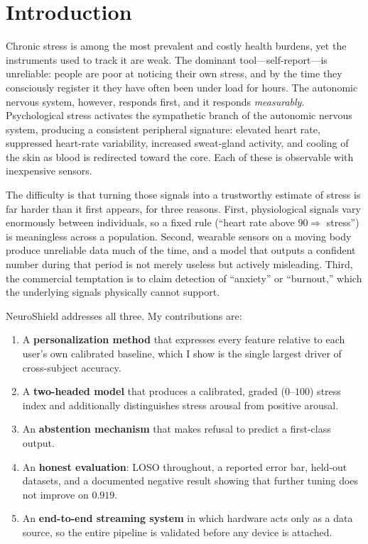 \documentclass[11pt,a4paper]{article}
\begin{document}
\section{Introduction}

Chronic stress is among the most prevalent and costly health burdens, yet the instruments used to
track it are weak. The dominant tool---self-report---is unreliable: people are poor at noticing
their own stress, and by the time they consciously register it they have often been under load for
hours. The autonomic nervous system, however, responds first, and it responds \emph{measurably}.
Psychological stress activates the sympathetic branch of the autonomic nervous system, producing a
consistent peripheral signature: elevated heart rate, suppressed heart-rate variability, increased
sweat-gland activity, and cooling of the skin as blood is redirected toward the core. Each of these
is observable with inexpensive sensors.

The difficulty is that turning those signals into a trustworthy estimate of stress is far harder
than it first appears, for three reasons. First, physiological signals vary enormously between
individuals, so a fixed rule (``heart rate above $90 \Rightarrow$ stress'') is meaningless across a
population. Second, wearable sensors on a moving body produce unreliable data much of the time, and
a model that outputs a confident number during that period is not merely useless but actively
misleading. Third, the commercial temptation is to claim detection of ``anxiety'' or ``burnout,''
which the underlying signals physically cannot support.

NeuroShield addresses all three. My contributions are:

\begin{enumerate}[leftmargin=1.4em,itemsep=0.15em]
  \item A \textbf{personalization method} that expresses every feature relative to each user's own
        calibrated baseline, which I show is the single largest driver of cross-subject accuracy.
  \item A \textbf{two-headed model} that produces a calibrated, graded ($0$--$100$) stress index and
        additionally distinguishes stress arousal from positive arousal.
  \item An \textbf{abstention mechanism} that makes refusal to predict a first-class output.
  \item An \textbf{honest evaluation}: LOSO throughout, a reported error bar, held-out datasets, and
        a documented negative result showing that further tuning does not improve on $0.919$.
  \item An \textbf{end-to-end streaming system} in which hardware acts only as a data source, so the
        entire pipeline is validated before any device is attached.
\end{enumerate}
\end{document}
